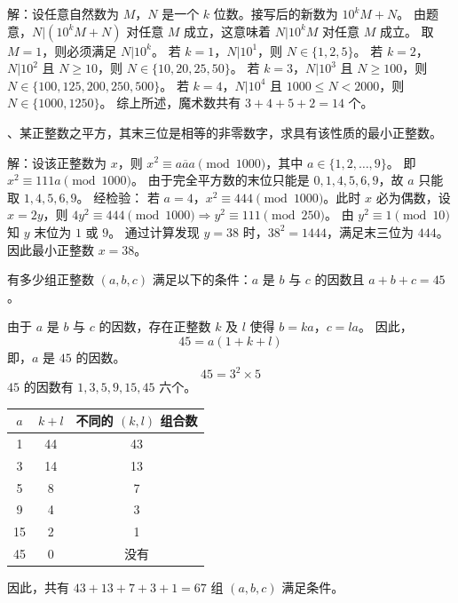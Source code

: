 \begin{questions}
\begin{solution}
解：设任意自然数为 $M$，$N$ 是一个 $k$ 位数。接写后的新数为 $10^k M + N$。
由题意，$N | (10^k M + N)$ 对任意 $M$ 成立，这意味着 $N | 10^k M$ 对任意 $M$ 成立。
取 $M=1$，则必须满足 $N | 10^k$。
若 $k=1$，$N | 10^1$，则 $N \in \{1, 2, 5\}$。
若 $k=2$，$N | 10^2$ 且 $N \ge 10$，则 $N \in \{10, 20, 25, 50\}$。
若 $k=3$，$N | 10^3$ 且 $N \ge 100$，则 $N \in \{100, 125, 200, 250, 500\}$。
若 $k=4$，$N | 10^4$ 且 $1000 \le N < 2000$，则 $N \in \{1000, 1250\}$。
综上所述，魔术数共有 $3 + 4 + 5 + 2 = 14$ 个。
\end{solution}

、某正整数之平方，其末三位是相等的非零数字，求具有该性质的最小正整数。

\begin{solution}
解：设该正整数为 $x$，则 $x^2 \equiv \overline{aaa} \pmod{1000}$，其中 $a \in \{1, 2, \dots, 9\}$。
即 $x^2 \equiv 111a \pmod{1000}$。
由于完全平方数的末位只能是 $0, 1, 4, 5, 6, 9$，故 $a$ 只能取 $1, 4, 5, 6, 9$。
经检验：
若 $a=4$，$x^2 \equiv 444 \pmod{1000}$。此时 $x$ 必为偶数，设 $x=2y$，则 $4y^2 \equiv 444 \pmod{1000} \Rightarrow y^2 \equiv 111 \pmod{250}$。
由 $y^2 \equiv 1 \pmod{10}$ 知 $y$ 末位为 $1$ 或 $9$。
通过计算发现 $y = 38$ 时，$38^2 = 1444$，满足末三位为 $444$。
因此最小正整数 $x = 38$。
\end{solution}

\question 有多少组正整数 $(a, b, c)$ 满足以下的条件：$a$ 是 $b$ 与 $c$ 的因数且 $a + b + c = 45$。

\begin{solution}
由于 $a$ 是 $b$ 与 $c$ 的因数，存在正整数 $k$ 及 $l$ 使得 $b = ka$，$c = la$。
因此，
\[
45 = a(1 + k + l)
\]
即，$a$ 是 $45$ 的因数。
\[
45 = 3^2 \times 5
\]
$45$ 的因数有 $1, 3, 5, 9, 15, 45$ 六个。

\begin{tabular}{|c|c|c|}
\hline
$a$ & $k + l$ & 不同的 $(k, l)$ 组合数 \\
\hline
1 & 44 & 43 \\
\hline
3 & 14 & 13 \\
\hline
5 & 8 & 7 \\
\hline
9 & 4 & 3 \\
\hline
15 & 2 & 1 \\
\hline
45 & 0 & 没有 \\
\hline
\end{tabular}

因此，共有 $43 + 13 + 7 + 3 + 1 = 67$ 组 $(a, b, c)$ 满足条件。
\end{solution}


\end{questions}
